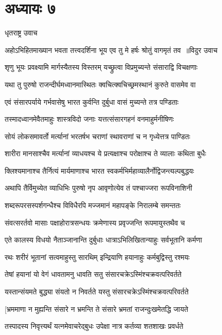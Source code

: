 \chapter{अध्यायः ७}
\twolineshloka
{धृतराष्ट्र उवाच}
{}


\threelineshloka
{अहोऽभिहितमाख्यान भवता तत्त्वदर्शिना}
{भूय एव तु मे हर्षः श्रोतुं वागमृतं तव ॥विदुर उवाच}
{}


\twolineshloka
{शृणु भूयः प्रवक्ष्यामि मार्गस्यैतस्य विस्तरम्}
{यच्छ्रुत्वा विप्रमुच्यन्ते संसाराद्वि विचक्षणाः}


\twolineshloka
{यथा तु पुरुषो राजन्दीर्घमध्वानमास्थितः}
{क्वचित्क्वचिच्छ्रमस्थानं कुरुते वासमेव वा}


\twolineshloka
{एवं संसारपर्याये गर्भवासेषु भारत}
{कुर्वन्ति दुर्बुधा वासं मुच्यन्ते तत्र पण्डिताः}


\twolineshloka
{तस्मादध्वानमेवैतमाहुः शास्त्रविदो जनाः}
{यत्तत्संसारगहनं वनमाहुर्मनीषिणः}


\twolineshloka
{सोयं लोकसमावर्तो मर्त्यानां भरतर्षभ}
{चराणां स्थावराणां च न गृध्येत्तत्र पाण्डितः}


\twolineshloka
{शारीरा मानसाश्चैव मर्त्यानां व्याधयश्च ये}
{प्रत्यक्षाश्च परोक्षाश्च ते व्यालाः कथिता बुधैः}


\twolineshloka
{क्लिश्यमानाश्च तैर्नित्यं मार्यमाणाश्च भारत}
{स्वकर्मभिर्महाव्यालैर्नोद्विजन्त्यल्पबुद्धयः}


\twolineshloka
{अथापि तैर्विमुच्येत व्याधिभिः पुरुषो नृप}
{आवृणोत्येव तं पश्चाज्जरा रूपविनाशिनी}


\twolineshloka
{शब्दरूपरसस्पर्शगन्धैश्च विविधैरपि}
{मज्जमानं महापङ्के निरालम्बे समन्ततः}


\twolineshloka
{संवत्सरर्तवो मासाः पक्षाहोरात्रसन्धयः}
{क्रमेणास्य प्रवृज्जन्ति रूपमायुस्तथैव च}


\twolineshloka
{एते कालस्य विधयो नैताञ्जानान्ति दुर्बुधाः}
{धात्राऽभिलिखितान्याहुः सर्वभूतानि कर्मणा}


\twolineshloka
{रथः शरीरं भूतानां सत्वमाहुस्तु सारथिम्}
{इन्द्रियाणि हयानाहुः कर्मबुद्विस्तु रश्मयः}


\twolineshloka
{तेषां हयानां यो वेगं धावतामनु धावति}
{सतु संसारचक्रेऽस्मिंश्चक्रवत्परिवर्तते}


\twolineshloka
{यस्तान्संयमते बुद्ध्या संयतो न निवर्तते}
{यस्तु संसारचक्रेऽस्मिंश्चक्रवत्परिवर्तते}


\twolineshloka
{[भ्रममाणा न मुह्यन्ति संसारे न भ्रमन्ति ते}
{संसारे भ्रमतां राजन्दुःखमेतद्धि जायते}


\twolineshloka
{तस्पादस्य निवृत्त्यर्थं यत्नमेवाचरेद्बुधः}
{उपेक्षा नात्र कर्तव्या शतशाखः प्रवर्धते}



